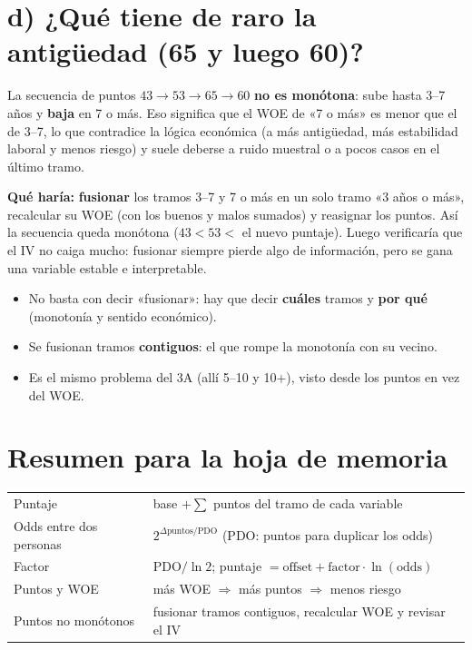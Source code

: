 \documentclass[11pt,a4paper]{article}
\begin{document}
\section*{d) ¿Qué tiene de raro la antigüedad (65 y luego 60)?}
\begin{ejemplar}
La secuencia de puntos $43\to53\to65\to60$ \textbf{no es monótona}: sube hasta 3--7 años y \textbf{baja} en 7 o más. Eso significa que el WOE de «7 o más» es menor que el de 3--7, lo que contradice la lógica económica (a más antigüedad, más estabilidad laboral y menos riesgo) y suele deberse a ruido muestral o a pocos casos en el último tramo.

\textbf{Qué haría:} \textbf{fusionar} los tramos 3--7 y 7 o más en un solo tramo «3 años o más», recalcular su WOE (con los buenos y malos sumados) y reasignar los puntos. Así la secuencia queda monótona ($43<53<$ el nuevo puntaje). Luego verificaría que el IV no caiga mucho: fusionar siempre pierde algo de información, pero se gana una variable estable e interpretable.
\end{ejemplar}
\begin{trampa}
\begin{itemize}[leftmargin=*,itemsep=0pt,topsep=0pt]
\item No basta con decir «fusionar»: hay que decir \textbf{cuáles} tramos y \textbf{por qué} (monotonía y sentido económico).
\item Se fusionan tramos \textbf{contiguos}: el que rompe la monotonía con su vecino.
\item Es el mismo problema del 3A (allí 5--10 y 10+), visto desde los puntos en vez del WOE.
\end{itemize}
\end{trampa}

\section*{Resumen para la hoja de memoria}
\begin{center}
\renewcommand{\arraystretch}{1.4}
\begin{tabular}{ll}\toprule
Puntaje & base $+\sum$ puntos del tramo de cada variable\\
Odds entre dos personas & $2^{\Delta\text{puntos}/\text{PDO}}$ \quad (PDO: puntos para duplicar los odds)\\
Factor & $\text{PDO}/\ln 2$; \quad puntaje $=\text{offset}+\text{factor}\cdot\ln(\text{odds})$\\
Puntos y WOE & más WOE $\Rightarrow$ más puntos $\Rightarrow$ menos riesgo\\
Puntos no monótonos & fusionar tramos contiguos, recalcular WOE y revisar el IV\\\bottomrule
\end{tabular}
\end{center}
\end{document}
